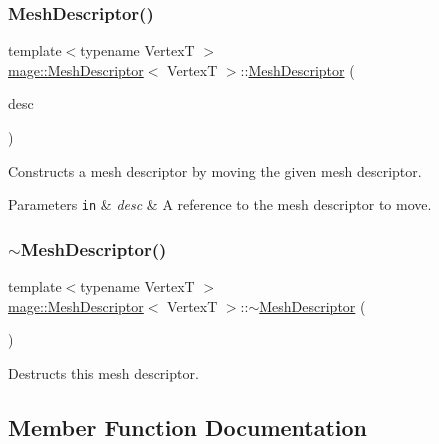 \subsubsection{\texorpdfstring{Mesh\+Descriptor()}{MeshDescriptor()}\hspace{0.1cm}{\footnotesize\ttfamily [3/3]}}
{\footnotesize\ttfamily template$<$typename VertexT $>$ \\
\hyperlink{structmage_1_1_mesh_descriptor}{mage\+::\+Mesh\+Descriptor}$<$ VertexT $>$\+::\hyperlink{structmage_1_1_mesh_descriptor}{Mesh\+Descriptor} (\begin{DoxyParamCaption}\item[{\hyperlink{structmage_1_1_mesh_descriptor}{Mesh\+Descriptor}$<$ VertexT $>$ \&\&}]{desc }\end{DoxyParamCaption})\hspace{0.3cm}{\ttfamily [default]}}

Constructs a mesh descriptor by moving the given mesh descriptor.


\begin{DoxyParams}[1]{Parameters}
\mbox{\tt in}  & {\em desc} & A reference to the mesh descriptor to move. \\
\hline
\end{DoxyParams}
\hypertarget{structmage_1_1_mesh_descriptor_adca32db164ab3032164c8dfe17af3db4}{}\label{structmage_1_1_mesh_descriptor_adca32db164ab3032164c8dfe17af3db4} 
\subsubsection{\texorpdfstring{$\sim$\+Mesh\+Descriptor()}{~MeshDescriptor()}}
{\footnotesize\ttfamily template$<$typename VertexT $>$ \\
\hyperlink{structmage_1_1_mesh_descriptor}{mage\+::\+Mesh\+Descriptor}$<$ VertexT $>$\+::$\sim$\hyperlink{structmage_1_1_mesh_descriptor}{Mesh\+Descriptor} (\begin{DoxyParamCaption}{ }\end{DoxyParamCaption})\hspace{0.3cm}{\ttfamily [default]}}

Destructs this mesh descriptor. 

\subsection{Member Function Documentation}
\hypertarget{structmage_1_1_mesh_descriptor_a7688db7ad2d756fff137f242120c8d25}{}\label{structmage_1_1_mesh_descriptor_a7688db7ad2d756fff137f242120c8d25} 
